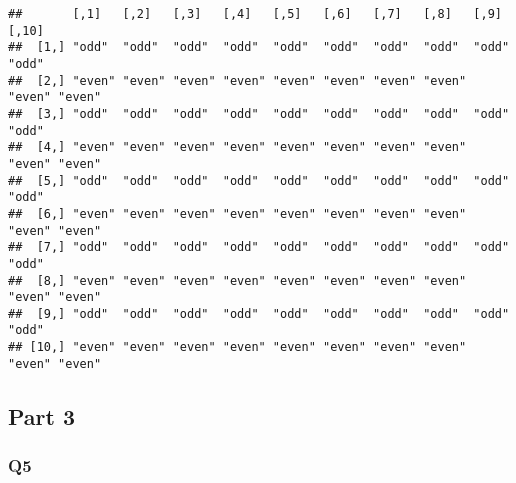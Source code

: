 \documentclass[
]{article}
\newenvironment{Shaded}{\begin{snugshade}}{\end{snugshade}}
\newcommand{\CommentTok}[1]{\textcolor[rgb]{0.56,0.35,0.01}{\textit{#1}}}
\newcommand{\ControlFlowTok}[1]{\textcolor[rgb]{0.13,0.29,0.53}{\textbf{#1}}}
\newcommand{\DataTypeTok}[1]{\textcolor[rgb]{0.13,0.29,0.53}{#1}}
\newcommand{\DecValTok}[1]{\textcolor[rgb]{0.00,0.00,0.81}{#1}}
\newcommand{\KeywordTok}[1]{\textcolor[rgb]{0.13,0.29,0.53}{\textbf{#1}}}
\newcommand{\NormalTok}[1]{#1}
\newcommand{\OperatorTok}[1]{\textcolor[rgb]{0.81,0.36,0.00}{\textbf{#1}}}
\newcommand{\StringTok}[1]{\textcolor[rgb]{0.31,0.60,0.02}{#1}}
\begin{document}
\begin{Shaded}
\end{Shaded}

\begin{verbatim}
##       [,1]   [,2]   [,3]   [,4]   [,5]   [,6]   [,7]   [,8]   [,9]   [,10] 
##  [1,] "odd"  "odd"  "odd"  "odd"  "odd"  "odd"  "odd"  "odd"  "odd"  "odd" 
##  [2,] "even" "even" "even" "even" "even" "even" "even" "even" "even" "even"
##  [3,] "odd"  "odd"  "odd"  "odd"  "odd"  "odd"  "odd"  "odd"  "odd"  "odd" 
##  [4,] "even" "even" "even" "even" "even" "even" "even" "even" "even" "even"
##  [5,] "odd"  "odd"  "odd"  "odd"  "odd"  "odd"  "odd"  "odd"  "odd"  "odd" 
##  [6,] "even" "even" "even" "even" "even" "even" "even" "even" "even" "even"
##  [7,] "odd"  "odd"  "odd"  "odd"  "odd"  "odd"  "odd"  "odd"  "odd"  "odd" 
##  [8,] "even" "even" "even" "even" "even" "even" "even" "even" "even" "even"
##  [9,] "odd"  "odd"  "odd"  "odd"  "odd"  "odd"  "odd"  "odd"  "odd"  "odd" 
## [10,] "even" "even" "even" "even" "even" "even" "even" "even" "even" "even"
\end{verbatim}

\hypertarget{part-3}{%
\subsection{Part 3}\label{part-3}}

\hypertarget{q5}{%
\subsubsection{Q5}\label{q5}}
\end{document}
